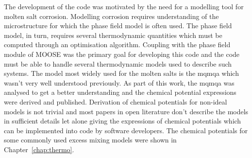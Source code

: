 	The development of the code was motivated by the need for a modelling tool for molten salt corrosion. Modelling corrosion requires understanding of the microstructure for which the phase field model is often used. The phase field model, in turn, requires several thermodynamic quantities which must be computed through an optimisation algorithm. Coupling with the phase field module of MOOSE was the primary goal for developing this code and the code must be able to handle several thermodynamic models used to describe such systems. The model most widely used for the molten salts is the \gls{mqmqa} which wasn't very well understood previously. As part of this work, the \gls{mqmqa} was analysed to get a better understanding and the chemical potential expressions were derived and published. Derivation of chemical potentials for non-ideal models is not trivial and most papers in open literature don't describe the models in sufficient details let alone giving the expressions of chemical potentials which can be implemented into code by software developers. The chemical potentials for some commonly used excess mixing models were shown in Chapter~\ref{chap:thermo}.
	
